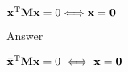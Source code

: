 $\bf x^{\rm T}Mx={\rm 0} \Longleftrightarrow x=0$

Answer

$\bf\bar x^{\rm T}Mx={\rm0}\iff x=0$

\bye

